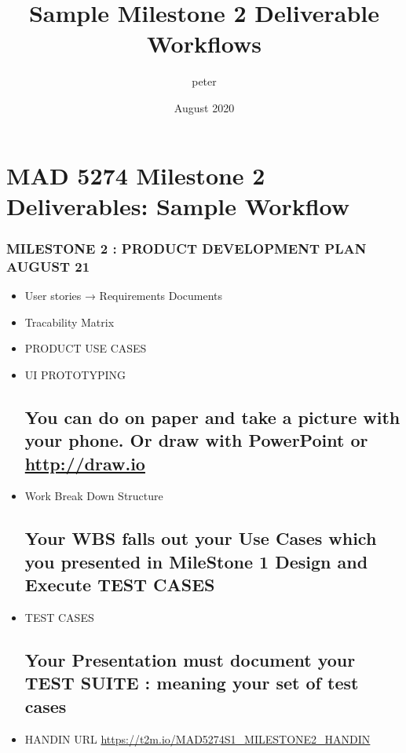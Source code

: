 \documentclass{article}
\title{Sample Milestone 2 Deliverable Workflows}
\author{peter }
\date{August 2020}
\begin{document}
\maketitle

\section{MAD 5274 Milestone 2 Deliverables: Sample Workflow}

\subsubsection{MILESTONE 2 : PRODUCT DEVELOPMENT PLAN AUGUST 21}

\begin{itemize}
    
    \item   User stories → Requirements Documents
    
    \item   Tracability Matrix
      
    \item   PRODUCT USE CASES
      
    \item   UI PROTOTYPING    
    \subsection{You can do on paper and take a picture with your phone. Or draw with PowerPoint or \url{http://draw.io}}
    
    \item   Work Break Down Structure
    \subsection{Your WBS falls out your Use Cases which you presented in MileStone 1 Design and Execute TEST CASES}
    
    \item   TEST CASES
    \subsection{Your Presentation must document your TEST SUITE : meaning your set of test cases}
      
    \item   HANDIN URL \url{https://t2m.io/MAD5274S1_MILESTONE2_HANDIN}
    
\end{itemize}
\end{document}
